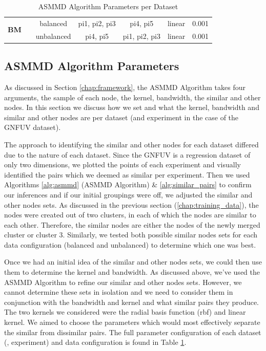 \documentclass{mpaper}
\begin{document}
\begin{table}[]
\begin{tabular}{|ccc|cccc|}
\multicolumn{1}{|c|}{\multirow{2}{*}{\textbf{BM}}}    & \multicolumn{1}{c|}{}                    & balanced           & \multicolumn{1}{c|}{pi1, pi2, pi3}           & \multicolumn{1}{c|}{pi4, pi5}              & \multicolumn{1}{c|}{linear}          & 0.001              \\
\multicolumn{1}{|c|}{}                                & \multicolumn{1}{c|}{}                    & unbalanced         & \multicolumn{1}{c|}{pi4, pi5}                & \multicolumn{1}{c|}{pi1, pi2, pi3}         & \multicolumn{1}{c|}{linear}          & 0.001              \\ \hline
\end{tabular}
\caption{\label{tab:asmmd_parameters} ASMMD Algorithm Parameters per Dataset}
\end{table}

\subsection{ASMMD Algorithm Parameters}\label{chap:asmmd_parameters}

As discussed in Section \ref{chap:framework}, the ASMMD Algorithm  takes four arguments, the sample of each node, the kernel, bandwidth, the similar and other nodes. In this section we discuss how we set and what the kernel, bandwidth and similar and other nodes are per dataset (and experiment in the case of the GNFUV dataset). 

The approach to identifying the similar and other nodes for each dataset differed due to the nature of each dataset. Since the GNFUV is a regression dataset of only two dimensions, we plotted the points of each experiment and visually identified the pairs which we deemed as similar per experiment. Then we used Algorithms \ref{alg:asmmd} (ASMMD Algorithm) \& \ref{alg:similar_pairs} to confirm our inferences and if our initial groupings were off, we adjusted the similar and other nodes sets. As discussed in the previous section (\ref{chap:training_data}), the nodes were created out of two clusters, in each of which the nodes are similar to each other. Therefore, the similar nodes are either the nodes of the newly merged cluster or cluster 3. Similarly, we tested both possible similar nodes sets for each data configuration (balanced and unbalanced) to determine which one was best. 

Once we had an initial idea of the similar and other nodes sets, we could then use them to determine the kernel and bandwidth. As discussed above, we've used the ASMMD Algorithm to refine our similar and other nodes sets. However, we cannot determine these sets in isolation and we need to consider them in conjunction with the bandwidth and kernel and what similar pairs they produce. The two kernels we considered were the radial basis function (rbf) and linear kernel. We aimed to choose the parameters which would most effectively separate the similar from dissimilar pairs. The full parameter configuration of each dataset (, experiment) and data configuration is found in Table \ref{tab:asmmd_parameters}.
\end{document}

